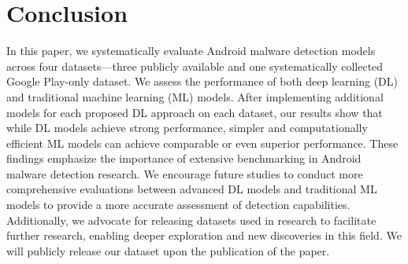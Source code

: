 \section{Conclusion}
In this paper, we systematically evaluate Android malware detection
models across four datasets—three publicly available and one
systematically collected Google Play-only dataset. We assess the
performance of both deep learning (DL) and traditional machine
learning (ML) models. After implementing additional models for each
proposed DL approach on each dataset, our results show that while DL
models achieve strong performance, %
simpler and computationally efficient ML
models%
can achieve comparable or even
superior performance. These findings emphasize the importance of
extensive benchmarking in Android malware detection research. We
encourage future studies to conduct more comprehensive evaluations
between advanced DL models and traditional ML models to provide a more
accurate assessment of detection capabilities. Additionally, we
advocate for releasing datasets used in research to facilitate further
research, enabling deeper exploration and new discoveries in this
field. 
We will publicly release our dataset upon the publication of the paper.



